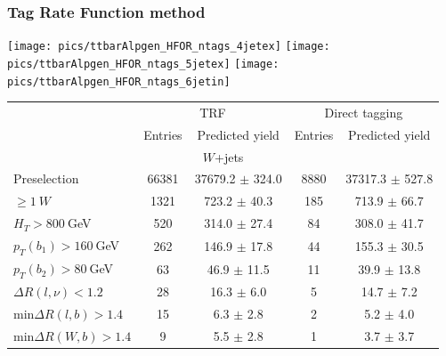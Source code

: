 \begin{frame}\frametitle{Tag Rate Function method}
\centering\scriptsize

\texttt{[image: pics/ttbarAlpgen\_HFOR\_ntags\_4jetex]}
\texttt{[image: pics/ttbarAlpgen\_HFOR\_ntags\_5jetex]}
\texttt{[image: pics/ttbarAlpgen\_HFOR\_ntags\_6jetin]}

\tiny
\begin{tabular}{lcccc} \toprule
  & \multicolumn{2}{c}{TRF} & \multicolumn{2}{c}{Direct tagging}\\
  & Entries & Predicted yield & Entries & Predicted yield  \\
\midrule
\multicolumn{5}{c}{$W$+jets} \\
\midrule
Preselection            & 66381  & 37679.2 	$\pm$ 	324.0 	 & 8880  & 37317.3 	$\pm$ 	527.8 	\\
$\geq 1~W$              & 1321  & 723.2 	$\pm$ 	40.3 	 & 185  & 713.9 	$\pm$ 	66.7 	\\
$H_T>800~$GeV           & 520  & 314.0 	        $\pm$ 	27.4 	 & 84  & 308.0 	        $\pm$ 	41.7 	\\
$p_T(b_1) > 160~$GeV    & 262  & 146.9 	        $\pm$ 	17.8 	 & 44  & 155.3 	        $\pm$ 	30.5 	\\
$p_T(b_2) >80~$GeV      & 63  & 46.9 	        $\pm$ 	11.5 	 & 11  & 39.9 	        $\pm$ 	13.8 	\\
$\Delta R(l,\nu)<1.2$   & 28  & 16.3 	        $\pm$ 	6.0 	 & 5  & 14.7 	        $\pm$ 	7.2 	\\
min$\Delta R(l,b)>1.4$  & 15  & 6.3 	        $\pm$ 	2.8 	 & 2  & 5.2 	        $\pm$ 	4.0 	\\
min$\Delta R(W,b)>1.4$  & 9  & 5.5 	        $\pm$ 	2.8 	 & 1  & 3.7 	        $\pm$ 	3.7 	\\\bottomrule
\end{tabular}


\end{frame}



